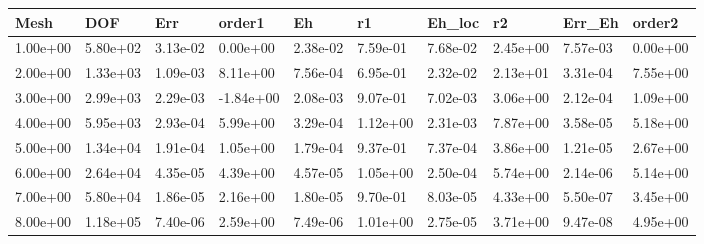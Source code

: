 \begin{tabular}{llllllllll}
Mesh & DOF & Err & order1 & Eh & r1 & Eh_loc & r2 & Err_Eh & order2 \\ 
\hline 
1.00e+00 & 5.80e+02 & 3.13e-02 &  0.00e+00 & 2.38e-02 & 7.59e-01 & 7.68e-02 & 2.45e+00 & 7.57e-03 & 0.00e+00 \\ 
2.00e+00 & 1.33e+03 & 1.09e-03 &  8.11e+00 & 7.56e-04 & 6.95e-01 & 2.32e-02 & 2.13e+01 & 3.31e-04 & 7.55e+00 \\ 
3.00e+00 & 2.99e+03 & 2.29e-03 & -1.84e+00 & 2.08e-03 & 9.07e-01 & 7.02e-03 & 3.06e+00 & 2.12e-04 & 1.09e+00 \\ 
4.00e+00 & 5.95e+03 & 2.93e-04 &  5.99e+00 & 3.29e-04 & 1.12e+00 & 2.31e-03 & 7.87e+00 & 3.58e-05 & 5.18e+00 \\ 
5.00e+00 & 1.34e+04 & 1.91e-04 &  1.05e+00 & 1.79e-04 & 9.37e-01 & 7.37e-04 & 3.86e+00 & 1.21e-05 & 2.67e+00 \\ 
6.00e+00 & 2.64e+04 & 4.35e-05 &  4.39e+00 & 4.57e-05 & 1.05e+00 & 2.50e-04 & 5.74e+00 & 2.14e-06 & 5.14e+00 \\ 
7.00e+00 & 5.80e+04 & 1.86e-05 &  2.16e+00 & 1.80e-05 & 9.70e-01 & 8.03e-05 & 4.33e+00 & 5.50e-07 & 3.45e+00 \\ 
8.00e+00 & 1.18e+05 & 7.40e-06 &  2.59e+00 & 7.49e-06 & 1.01e+00 & 2.75e-05 & 3.71e+00 & 9.47e-08 & 4.95e+00 \\ 
\hline 
\end{tabular}